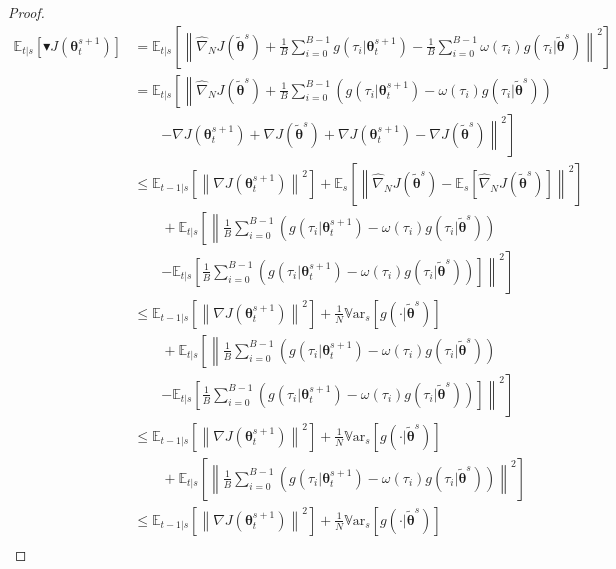 \documentclass{article}
\theoremstyle{remark}
\theoremstyle{definition}
\newcommand{\norm}[2][\infty]{\left\|#2\right\|_{#1}}
\newcommand{\vtheta}{\boldsymbol{\theta}}
\newcommand{\gradJ}[1]{\nabla J(#1)}
\newcommand{\gradApp}[2]{\widehat{\nabla}_{#2}J(#1)}
\newcommand{\Ets}[2][t]{\mathbb{E}_{#1\vert s}\left[#2\right]}
\newcommand{\Es}[1]{\mathbb{E}_{s}\left[#1\right]}
\newcommand{\Vars}[1]{{\mathbb{V}\text{ar}}_{s}\left[#1\right]}
\newcommand{\gradBlack}[1]{\blacktriangledown J(#1)}
\begin{document}
\begin{proof}
	\begin{align}
	\Ets{\gradBlack{\vtheta_t^{s+1}}} 
	&= \Ets{\norm[]{\gradApp{\tilde{\vtheta}^s}{N}
			+\frac{1}{B}\sum_{i=0}^{B-1} g(\tau_i\vert\vtheta_t^{s+1}) 
			-\frac{1}{B}\sum_{i=0}^{B-1}
			\omega(\tau_i)g(\tau_i\vert\tilde{\vtheta}^s)}^2} \nonumber\\
	&= \mathbb{E}_{t\vert s}\left[\left\|\gradApp{\tilde{\vtheta}^s}{N}
			+\frac{1}{B}\sum_{i=0}^{B-1}\left( 
			g(\tau_i\vert\vtheta_t^{s+1}) -
			\omega(\tau_i)g(\tau_i\vert\tilde{\vtheta}^s)\right)
			\right.\right.\nonumber\\&\qquad\left.\left.
			-\gradJ{\vtheta_t^{s+1}} + \gradJ{\tilde{\vtheta}^s}
			+\gradJ{\vtheta_t^{s+1}} - \gradJ{\tilde{\vtheta}^s}\right\|^2\right] \nonumber\\
	&\leq \Ets[t-1]{\norm[]{\gradJ{\vtheta_t^{s+1}}}^2}
	+\Es{\norm[]{\gradApp{\tilde{\vtheta}^s}{N} - \Es{\gradApp{\tilde{\vtheta}^s}{N}}}^2} \nonumber\\
	&\qquad+ 
	\mathbb{E}_{t\vert s}\left[\left\|
		\frac{1}{B}\sum_{i=0}^{B-1}\left(
		g(\tau_i\vert\vtheta_t^{s+1}) -
			\omega(\tau_i)g(\tau_i\vert\tilde{\vtheta}^s)\right)
		\right.\right.\nonumber\\&\qquad\left.\left.
		- \Ets{
			\frac{1}{B}\sum_{i=0}^{B-1}\left(
			g(\tau_i\vert\vtheta_t^{s+1}) -
				\omega(\tau_i)g(\tau_i\vert\tilde{\vtheta}^s)\right)}\right\|^2\right] 
	\nonumber\\
	&\leq \Ets[t-1]{\norm[]{\gradJ{\vtheta_t^{s+1}}}^2} 
	+\frac{1}{N}\Vars{g(\cdot\vert\tilde{\vtheta}^s)}
	\nonumber\\
	&\qquad+ 
		\mathbb{E}_{t\vert s}\left[\left\|
		\frac{1}{B}\sum_{i=0}^{B-1}\left(
		g(\tau_i\vert\vtheta_t^{s+1}) -
		\omega(\tau_i)g(\tau_i\vert\tilde{\vtheta}^s)\right)
		\right.\right.\nonumber\\&\qquad\left.\left.
		- \Ets{
			\frac{1}{B}\sum_{i=0}^{B-1}\left(
			g(\tau_i\vert\vtheta_t^{s+1}) -
			\omega(\tau_i)g(\tau_i\vert\tilde{\vtheta}^s)\right)}\right\|^2\right] 
		\label{eq:1}\\%
	&\leq \Ets[t-1]{\norm[]{\gradJ{\vtheta_t^{s+1}}}^2} 
	+\frac{1}{N}\Vars{g(\cdot\vert\tilde{\vtheta}^s)} \nonumber\\
	&\qquad+\Ets{\norm[]{
			\frac{1}{B}\sum_{i=0}^{B-1}\left(
			g(\tau_i\vert\vtheta_t^{s+1}) -
			\omega(\tau_i)g(\tau_i\vert\tilde{\vtheta}^s)\right)}^2} \label{eq:2}\\
	&\leq \Ets[t-1]{\norm[]{\gradJ{\vtheta_t^{s+1}}}^2} 
	+\frac{1}{N}\Vars{g(\cdot\vert\tilde{\vtheta}^s)} \nonumber\\

\end{align}
\end{proof}
\end{document}
